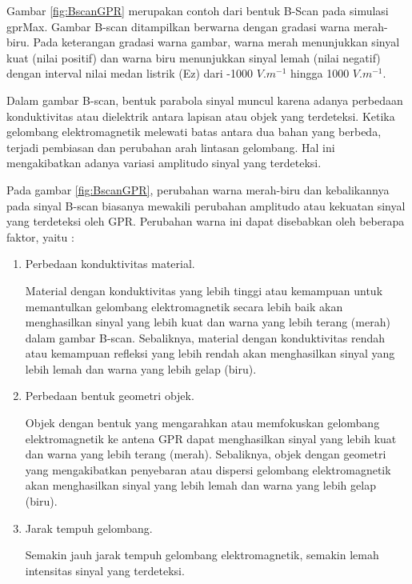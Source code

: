 Gambar \ref{fig:BscanGPR} merupakan contoh dari bentuk B-Scan pada simulasi gprMax. 
Gambar B-scan ditampilkan berwarna dengan gradasi warna merah-biru. 
Pada keterangan gradasi warna gambar, warna merah menunjukkan sinyal kuat (nilai positif) dan warna biru menunjukkan sinyal lemah (nilai negatif) dengan interval nilai medan listrik (Ez) dari -1000 $V.m^{-1}$ hingga 1000 $V.m^{-1}$.

Dalam gambar B-scan, bentuk parabola sinyal muncul karena adanya perbedaan konduktivitas atau dielektrik antara lapisan atau objek yang terdeteksi. 
Ketika gelombang elektromagnetik melewati batas antara dua bahan yang berbeda, terjadi pembiasan dan perubahan arah lintasan gelombang.
Hal ini mengakibatkan adanya variasi amplitudo sinyal yang terdeteksi.

Pada gambar \ref{fig:BscanGPR}, perubahan warna merah-biru dan kebalikannya pada sinyal B-scan biasanya mewakili perubahan amplitudo atau kekuatan sinyal yang terdeteksi oleh GPR. 
Perubahan warna ini dapat disebabkan oleh beberapa faktor, yaitu : 

\begin{enumerate}[nolistsep]

  \item Perbedaan konduktivitas material.
  
  Material dengan konduktivitas yang lebih tinggi atau kemampuan untuk memantulkan gelombang elektromagnetik secara lebih baik akan menghasilkan sinyal yang lebih kuat dan warna yang lebih terang (merah) dalam gambar B-scan. 
  Sebaliknya, material dengan konduktivitas rendah atau kemampuan refleksi yang lebih rendah akan menghasilkan sinyal yang lebih lemah dan warna yang lebih gelap (biru).   

  \item Perbedaan bentuk geometri objek.
  
  Objek dengan bentuk yang mengarahkan atau memfokuskan gelombang elektromagnetik ke antena GPR dapat menghasilkan sinyal yang lebih kuat dan warna yang lebih terang (merah). 
  Sebaliknya, objek dengan geometri yang mengakibatkan penyebaran atau dispersi gelombang elektromagnetik akan menghasilkan sinyal yang lebih lemah dan warna yang lebih gelap (biru).

  \item Jarak tempuh gelombang.
  
  Semakin jauh jarak tempuh gelombang elektromagnetik, semakin lemah intensitas sinyal yang terdeteksi. 
\end{enumerate}


